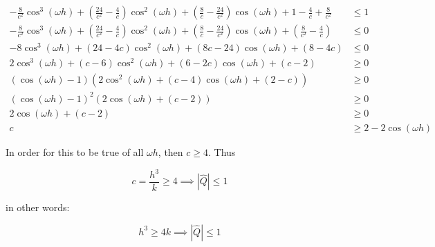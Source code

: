 \documentclass[11pt]{amsart}
\numberwithin{equation}{section}
\begin{document}
\begin{enumerate}[a)]
{          \begin{align}
              - \frac{8}{c^2} \cos^3(\omega h) + \left(\frac{24}{c^2} - \frac{4}{c}\right) \cos^2(\omega h) + \left(\frac{8}{c} - \frac{24}{c^2}\right) \cos(\omega h) + 1 - \frac{4}{c} + \frac{8}{c^2}            & \le 1                    \\
              - \frac{8}{c^2} \cos^3(\omega h) + \left(\frac{24}{c^2} - \frac{4}{c}\right) \cos^2(\omega h) + \left(\frac{8}{c} - \frac{24}{c^2}\right) \cos(\omega h) + \left( \frac{8}{c^2}  - \frac{4}{c}\right) & \le 0                    \\
              - 8 \cos^3(\omega h) + \left(24 - 4c\right) \cos^2(\omega h) + \left(8c - 24\right) \cos(\omega h) + \left( 8  - 4c\right)                                                                            & \le 0                    \\
              2 \cos^3(\omega h) + \left(c - 6\right) \cos^2(\omega h) + \left(6 - 2c\right) \cos(\omega h) + \left(c - 2\right)                                                                                    & \ge 0                    \\
              (\cos(\omega h) - 1) (2 \cos^2(\omega h) + (c-4) \cos(\omega h) + (2 - c))                                                                                                                            & \ge 0                    \\
              (\cos(\omega h) - 1)^2 (2 \cos(\omega h) + (c - 2))                                                                                                                                                   & \ge 0                    \\
              2 \cos(\omega h) + (c - 2)                                                                                                                                                                            & \ge 0                    \\
              c                                                                                                                                                                                                     & \ge  2 - 2\cos(\omega h)
          \end{align}
          
          In order for this to be true of all $\omega h$, then $c \ge 4$. Thus
          
          \begin{equation}
              c = \frac{h^3}{k} \ge 4 \implies |\hat Q| \le 1
          \end{equation}
          
          in other words:
          
          \begin{equation}
              h^3 \ge 4k \implies |\hat Q| \le 1
          \end{equation}
          
          }
          
\end{enumerate}
\end{document}
